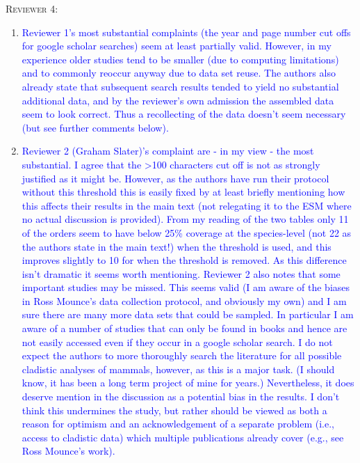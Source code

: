 \documentclass[12pt,letterpaper]{article}
\renewcommand{\section}[1]{%
\bigskip
\begin{center}
\begin{Large}
\normalfont\scshape #1
\medskip
\end{Large}
\end{center}}
\begin{document}

\section{Reviewer 4:}
\begin{enumerate}
\item{\textcolor{blue}{Reviewer 1’s most substantial complaints (the year and page number cut offs for google scholar searches) seem at least partially valid.
However, in my experience older studies tend to be smaller (due to computing limitations) and to commonly reoccur anyway due to data set reuse.
The authors also already state that subsequent search results tended to yield no substantial additional data, and by the reviewer’s own admission the assembled data seem to look correct.
Thus a recollecting of the data doesn’t seem necessary (but see further comments below).}}

\item{\textcolor{blue}{Reviewer 2 (Graham Slater)’s complaint are - in my view - the most substantial.
I agree that the >100 characters cut off is not as strongly justified as it might be.
However, as the authors have run their protocol without this threshold this is easily fixed by at least briefly mentioning how this affects their results in the main text (not relegating it to the ESM where no actual discussion is provided).
From my reading of the two tables only 11 of the orders seem to have below 25\% coverage at the species-level (not 22 as the authors state in the main text!) when the threshold is used, and this improves slightly to 10 for when the threshold is removed.
As this difference isn’t dramatic it seems worth mentioning.
Reviewer 2 also notes that some important studies may be missed.
This seems valid (I am aware of the biases in Ross Mounce’s data collection protocol, and obviously my own) and I am sure there are many more data sets that could be sampled.
In particular I am aware of a number of studies that can only be found in books and hence are not easily accessed even if they occur in a google scholar search.
I do not expect the authors to more thoroughly search the literature for all possible cladistic analyses of mammals, however, as this is a major task.
(I should know, it has been a long term project of mine for years.)
Nevertheless, it does deserve mention in the discussion as a potential bias in the results.
I don’t think this undermines the study, but rather should be viewed as both a reason for optimism and an acknowledgement of a separate problem (i.e., access to cladistic data) which multiple publications already cover (e.g., see Ross Mounce’s work).}}


\end{enumerate}
\end{document}
